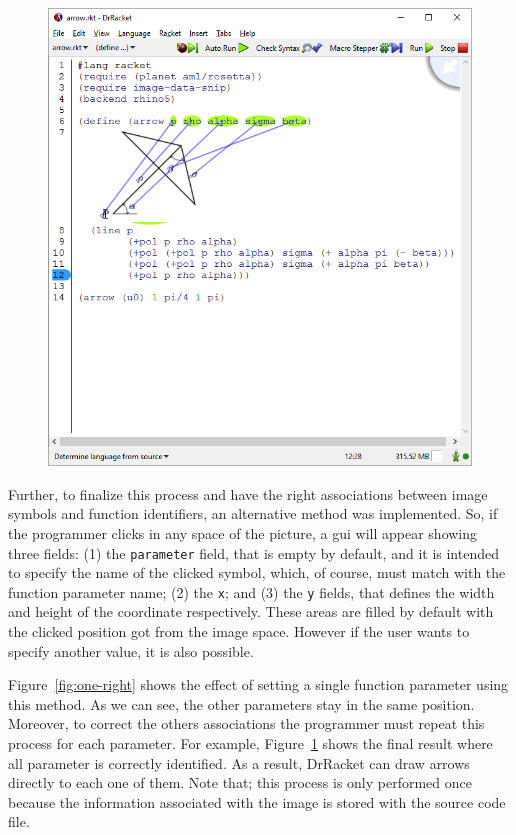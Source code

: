\begin{figure}[!h]
\begin{minipage}[t]{.495\textwidth}
  \includegraphics[width=1\linewidth]{images/4}
  \label{fig:alright}
\end{minipage}
\end{figure}

Further, to finalize this process and have the right associations between image symbols and function identifiers, an alternative method was implemented. So, if the programmer clicks in any space of the picture, a \gls{gui} will appear showing three fields: (1) the \texttt{parameter} field, that is empty by default, and it is intended to specify the name of the clicked symbol, which, of course, must match with the function parameter name; (2) the \texttt{x}; and (3) the \texttt{y} fields, that defines the width and height of the coordinate respectively. These areas are filled by default with the clicked position got from the image space. However if the user wants to specify another value, it is also possible.

Figure~\ref{fig:one-right} shows the effect of setting a single function parameter using this method. As we can see, the other parameters stay in the same position. Moreover, to correct the others associations the programmer must repeat this process for each parameter. For example, Figure~\ref{fig:alright} shows the final result where all parameter is correctly identified. As a result, DrRacket can draw arrows directly to each one of them. Note that; this process is only performed once because the information associated with the image is stored with the source code file.

